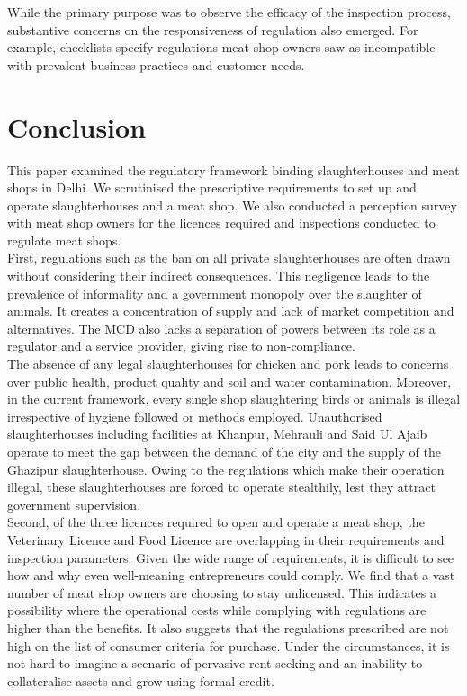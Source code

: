 \documentclass[a4paper, 12pt, twoside]{article}
\begin{document}
While the primary purpose was to observe the efficacy of the inspection process, substantive concerns on the responsiveness of regulation also emerged. For example, checklists specify regulations meat shop owners saw as incompatible with prevalent business practices and customer needs. 

\section*{Conclusion}
This paper examined the regulatory framework binding slaughterhouses and meat shops in Delhi. We scrutinised the prescriptive requirements to set up and operate slaughterhouses and a meat shop. We also conducted a perception survey with meat shop owners for the licences required and inspections conducted to regulate meat shops.\\ 

First, regulations such as the ban on all private slaughterhouses are often drawn without considering their indirect consequences. This negligence leads to the prevalence of informality and a government monopoly over the slaughter of animals. It creates a concentration of supply and lack of market competition and alternatives. The MCD also lacks a separation of powers between its role as a regulator and a service provider, giving rise to non-compliance.\\

The absence of any legal slaughterhouses for chicken and pork leads to concerns over public health, product quality and soil and water contamination. Moreover, in the current framework, every single shop slaughtering birds or animals is illegal irrespective of hygiene followed or methods employed. Unauthorised slaughterhouses including facilities at Khanpur, Mehrauli and Said Ul Ajaib operate to meet the gap between the demand of the city and the supply of the Ghazipur slaughterhouse. Owing to the regulations which make their operation illegal, these slaughterhouses are forced to operate stealthily, lest they attract government supervision. \\

Second, of the three licences required to open and operate a meat shop, the Veterinary Licence and Food Licence are overlapping in their requirements and inspection parameters. Given the wide range of requirements, it is difficult to see how and why even well-meaning entrepreneurs could comply. We find that a vast number of meat shop owners are choosing to stay unlicensed. This indicates a possibility where the operational costs while complying with regulations are higher than the benefits. It also suggests that the regulations prescribed are not high on the list of consumer criteria for purchase. Under the circumstances, it is not hard to imagine a scenario of pervasive rent seeking and an inability to collateralise assets and grow using formal credit. \\
\end{document}
